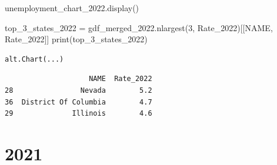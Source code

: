 \documentclass[
  letterpaper,
  DIV=11,
  numbers=noendperiod]{scrartcl}
\newenvironment{Shaded}{\begin{snugshade}}{\end{snugshade}}
\newcommand{\BuiltInTok}[1]{\textcolor[rgb]{0.00,0.23,0.31}{#1}}
\newcommand{\DecValTok}[1]{\textcolor[rgb]{0.68,0.00,0.00}{#1}}
\newcommand{\NormalTok}[1]{\textcolor[rgb]{0.00,0.23,0.31}{#1}}
\newcommand{\OperatorTok}[1]{\textcolor[rgb]{0.37,0.37,0.37}{#1}}
\newcommand{\StringTok}[1]{\textcolor[rgb]{0.13,0.47,0.30}{#1}}
\begin{document}
\begin{Shaded}
\begin{Highlighting}[]
\NormalTok{unemployment\_chart\_2022.display()}

\NormalTok{top\_3\_states\_2022 }\OperatorTok{=}\NormalTok{ gdf\_merged\_2022.nlargest(}\DecValTok{3}\NormalTok{, }\StringTok{\textquotesingle{}Rate\_2022\textquotesingle{}}\NormalTok{)[[}\StringTok{\textquotesingle{}NAME\textquotesingle{}}\NormalTok{, }\StringTok{\textquotesingle{}Rate\_2022\textquotesingle{}}\NormalTok{]]}
\BuiltInTok{print}\NormalTok{(top\_3\_states\_2022)}
\end{Highlighting}
\end{Shaded}

\begin{verbatim}
alt.Chart(...)
\end{verbatim}

\begin{verbatim}
                    NAME  Rate_2022
28                Nevada        5.2
36  District Of Columbia        4.7
29              Illinois        4.6
\end{verbatim}

\section{2021}\label{section-3}
\end{document}
